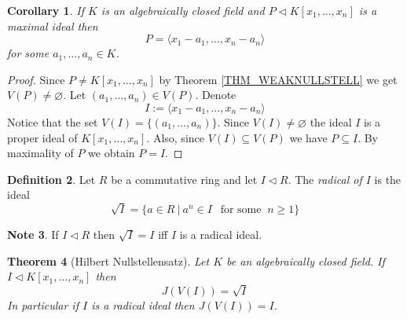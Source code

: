 \documentclass[12pt, letterpaper, oneside]{article}
\theoremstyle{plain}
\newtheorem{theorem}{Theorem}[section]
\newtheorem{corollary}[theorem]{Corollary}
\theoremstyle{definition}
\newtheorem{definition}[theorem]{Definition}
\newtheorem{note}[theorem]{Note}
\newcommand{\subgp}[1]{\langle#1\rangle}
\newcommand{\vs}{\vskip 5mm}
\begin{document}
\vs\vs

\begin{corollary}
If $K$ is an algebraically closed field and $P\lhd K[x_{1}, \dots, x_{n}]$ is  a maximal ideal then 
$$P = \subgp{x_{1}-a_{1}, \dots, x_{n}-a_{n}}$$
for some $a_{1}, \dots, a_{n}\in K$.
\end{corollary}


\vs

\begin{proof}
Since $P\neq K[x_{1}, \dots, x_{n}]$ by Theorem \ref{THM_WEAKNULLSTELL} we get 
$V(P) \neq \varnothing$. Let $(a_{1}, \dots, a_{n})\in V(P)$. Denote 
$$I := \subgp{x_{1}-a_{1}, \dots, x_{n}-a_{n}}$$
Notice that the set $V(I) =  \{(a_{1}, \dots, a_{n})\}$. 
Since $V(I) \neq \varnothing$ the ideal $I$ is a proper ideal of $K[x_{1}, \dots, x_{n}]$. 
Also, since $V(I)\subseteq V(P)$ we have $P\subseteq I$. By maximality of $P$ we 
obtain $P= I$. 
\end{proof}



\vs\vs

\begin{definition}
Let $R$ be a commutative ring and let $I\lhd R$. The \emph{radical of $I$} is the ideal 
$$\sqrt{I} = \{ a\in R \ | \ a^{n} \in I \ \ \text{ for some } \  n\geq 1 \}$$
\end{definition}

\vs\vs

\begin{note}
If $I\lhd R$ then $\sqrt{I} = I$ iff $I$ is a radical ideal.
\end{note}

\vs\vs

\begin{theorem}[Hilbert Nullstellensatz]
\label{THM_NULLSTELL}
Let $K$ be an algebraically closed field. If $I\lhd K[x_{1}, \dots, x_{n}]$ then 
$$J(V(I)) = \sqrt{I}$$
In particular if $I$ is a radical ideal then $J(V(I)) = I$.  

\end{theorem}


\vs
\end{document}
